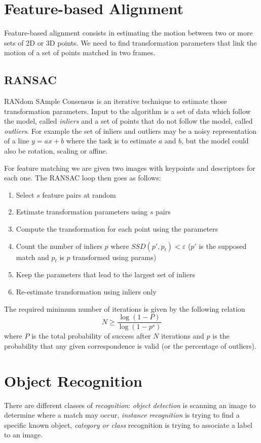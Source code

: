 \documentclass[a4paper,twocolumn]{article}
\begin{document}
\section{Feature-based Alignment}
Feature-based alignment consists in estimating the motion between two or more
sets of 2D or 3D points. We need to find transformation parameters that link
the motion of a set of points matched in two frames.

\subsection{RANSAC}
RANdom SAmple Consensus is an iterative technique to estimate those transformation
parameters. Input to the algorithm is a set of data which follow the model,
called \textit{inliers} and a set of points that do not follow the model, called
\textit{outliers}. For example the set of inliers and outliers may be a noisy
representation of a line $y=ax+b$ where the task is to estimate $a$ and
$b$, but the model could also be rotation, scaling or affine.

For feature matching we are given two images with keypoints and descriptors for
each one. The RANSAC loop then goes as follows:
\begin{enumerate}
	\item Select $s$ feature pairs at random
	\item Estimate transformation parameters using $s$ pairs
	\item Compute the transformation for each point using the parameters
	\item Count the number of inliers $p$ where $SSD(p',p_t)<\varepsilon$
		($p'$ is the supposed match and $p_t$ is $p$ transformed using params)
	\item Keep the parameters that lead to the largest set of inliers
	\item Re-estimate transformation using inliers only
\end{enumerate}
The required minimum number of iterations is given by the following relation
\begin{equation}
	N \ge \frac{\log(1-P)}{\log(1-p^s)}
\end{equation}
where $P$ is the total probability of success after $N$ iterations and
$p$ is the probability that any given correspondence is valid (or the percentage
of outliers).


\section{Object Recognition}
There are different classes of \textit{recognition}: \textit{object detection}
is scanning an image to determine where a match may occur, \textit{instance
recognition} is trying to find a specific known object, \textit{category or
class} recognition is trying to associate a label to an image.
\end{document}
